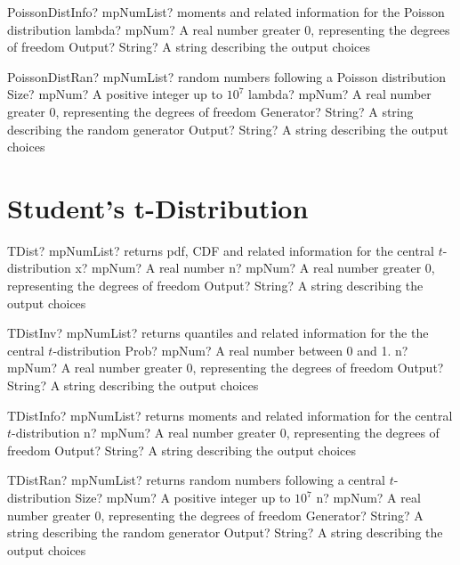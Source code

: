 \documentclass[12pt,a4paper,openany]{book}
\begin{document}
\begin{mpFunctionsExtract}
\mpFunctionTwo
{PoissonDistInfo? mpNumList? moments and related information for the Poisson distribution}
{lambda? mpNum? A real number greater 0, representing the degrees of freedom}
{Output? String? A string describing the output choices}
\end{mpFunctionsExtract}

\begin{mpFunctionsExtract}
\mpFunctionFour
{PoissonDistRan? mpNumList? random numbers following a Poisson distribution}
{Size? mpNum? A positive integer up to $10^7$}
{lambda? mpNum? A real number greater 0, representing the degrees of freedom}
{Generator? String? A string describing the random generator}
{Output? String? A string describing the output choices}
\end{mpFunctionsExtract}

\section{Student's t-Distribution}

\begin{mpFunctionsExtract}
\mpFunctionThree
{TDist? mpNumList? returns pdf, CDF and related information for the central $t$-distribution}
{x? mpNum? A real number}
{n? mpNum? A real number greater 0, representing the degrees of freedom}
{Output? String? A string describing the output choices}
\end{mpFunctionsExtract}

\begin{mpFunctionsExtract}
\mpFunctionThree
{TDistInv? mpNumList? returns quantiles and related information for the the central $t$-distribution}
{Prob? mpNum? A real number between 0 and 1.}
{n? mpNum? A real number greater 0, representing the degrees of freedom}
{Output? String? A string describing the output choices}
\end{mpFunctionsExtract}

\begin{mpFunctionsExtract}
\mpFunctionTwo
{TDistInfo? mpNumList? returns moments and related information for the central $t$-distribution}
{n? mpNum? A real number greater 0, representing the degrees of freedom}
{Output? String? A string describing the output choices}
\end{mpFunctionsExtract}

\begin{mpFunctionsExtract}
\mpFunctionFour
{TDistRan? mpNumList? returns random numbers following a central $t$-distribution}
{Size? mpNum? A positive integer up to $10^7$}
{n? mpNum? A real number greater 0, representing the degrees of freedom}
{Generator? String? A string describing the random generator}
{Output? String? A string describing the output choices}
\end{mpFunctionsExtract}
\end{document}
